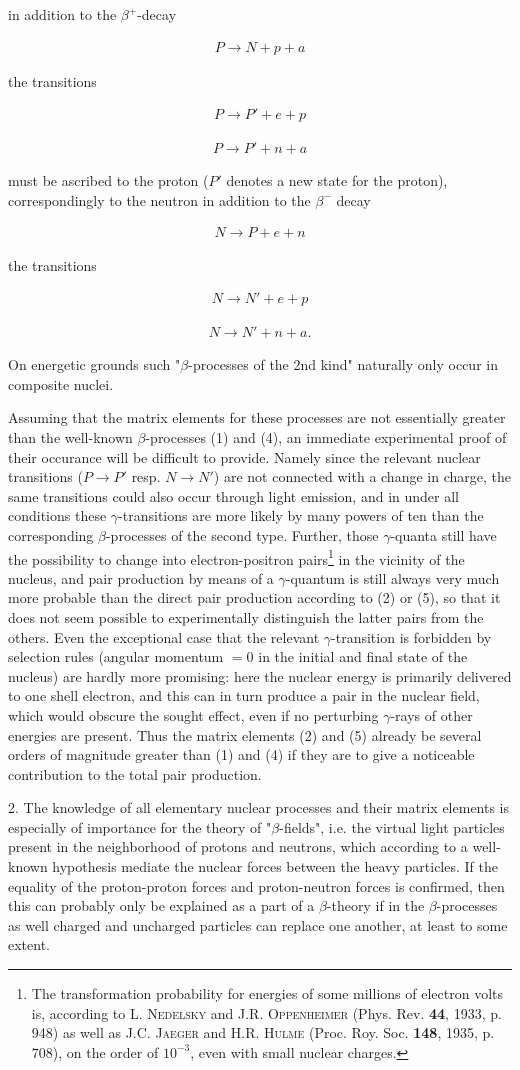 \documentclass{article}
\newcommand{\nequ}[2]{
\begin{align*}
#1
\tag{#2}
\end{align*}
}
\begin{document}
in addition to the $\beta^+$-decay
\nequ{
P \to N + p + a
}{1}
the transitions
\nequ{
P \to P' + e + p
}{2}
\nequ{
P \to P' + n + a
}{3}
must be ascribed to the proton ($P'$ denotes a new state for the proton), correspondingly to the neutron in addition to the $\beta^-$ decay
\nequ{
N \to P + e + n
}{4}
the transitions
\nequ{
N \to N' + e + p
}{5}
\nequ{
N \to N' + n + a.
}{6}
On energetic grounds such "$\beta$-processes of the 2nd kind" naturally only occur in composite nuclei.

Assuming that the matrix elements for these processes are not essentially greater than the well-known $\beta$-processes (1) and (4), an immediate experimental proof of their occurance will be difficult to provide. Namely since the relevant nuclear transitions ($P\to P'$ resp. $N \to N'$) are not connected with a change in charge, the same transitions could also occur through light emission, and in under all conditions these $\gamma$-transitions are more likely by many powers of ten than the corresponding $\beta$-processes of the second type. Further, those $\gamma$-quanta still have the possibility to change into electron-positron pairs\footnote{The transformation probability for energies of some millions of electron volts is, according to \textsc{L. Nedelsky} and \textsc{J.R. Oppenheimer} (Phys. Rev. \textbf{44}, 1933, p. 948) as well as \textsc{J.C. Jaeger} and \textsc{H.R. Hulme} (Proc. Roy. Soc. \textbf{148}, 1935, p. 708), on the order of $10^{-3}$, even with small nuclear charges.} in the vicinity of the nucleus, and pair production by means of a $\gamma$-quantum is still always very much more probable than the direct pair production according to (2) or (5), so that it does not seem possible to experimentally distinguish the latter pairs from the others. Even the exceptional case that the relevant $\gamma$-transition is forbidden by selection rules (angular momentum $=0$ in the initial and final state of the nucleus) are hardly more promising: here the nuclear energy is primarily delivered to one shell electron, and this can in turn produce a pair in the nuclear field, which would obscure the sought effect, even if no perturbing $\gamma$-rays of other energies are present. Thus the matrix elements (2) and (5) already be several orders of magnitude greater than (1) and (4) if they are to give a noticeable contribution to the total pair production.

2. The knowledge of all elementary nuclear processes and their matrix elements is especially of importance for the theory of "$\beta$-fields", i.e. the virtual light particles present in the neighborhood of protons and neutrons, which according to a well-known hypothesis mediate the nuclear forces between the heavy particles. If the equality of the proton-proton forces and proton-neutron forces is confirmed, then this can probably only be explained as a part of a $\beta$-theory if in the $\beta$-processes as well charged and uncharged particles can replace one another, at least to some extent.
\end{document}
